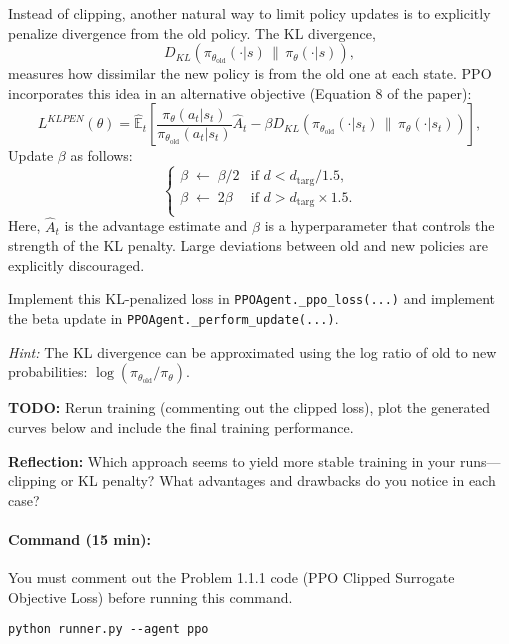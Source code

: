 \documentclass[12pt]{article}
\begin{document}
Instead of clipping, another natural way to limit policy updates is to explicitly penalize divergence from the old policy. The KL divergence,
\[
D_{KL}\!\left(\pi_{\theta_{\text{old}}}(\cdot|s) \,\|\, \pi_\theta(\cdot|s)\right),
\]
measures how dissimilar the new policy is from the old one at each state. PPO incorporates this idea in an alternative objective (Equation 8 of the paper):
\begin{equation}
L^{KLPEN}(\theta) = \hat{\mathbb{E}}_t \left[ \frac{\pi_\theta(a_t|s_t)}{\pi_{\theta_{\text{old}}}(a_t|s_t)} \hat{A}_t - \beta D_{KL}\!\left(\pi_{\theta_{\text{old}}}(\cdot|s_t) \,\|\, \pi_\theta(\cdot|s_t)\right) \right],
\end{equation}
Update $\beta$ as follows:
\[
\begin{cases}
\beta \;\leftarrow\; \beta/2 & \text{if } d < d_{\text{targ}} / 1.5, \\
\beta \;\leftarrow\; 2\beta & \text{if } d > d_{\text{targ}} \times 1.5. \\
\end{cases}
\]
\noindent
Here, $\hat{A}_t$ is the advantage estimate and $\beta$ is a hyperparameter that controls the strength of the KL penalty. Large deviations between old and new policies are explicitly discouraged.

Implement this KL-penalized loss in \texttt{PPOAgent.\_ppo\_loss(...)} and implement the beta update in \texttt{PPOAgent.\_perform\_update(...)}.

\textit{Hint:} The KL divergence can be approximated using the log ratio of old to new probabilities: $\log(\pi_{\theta_{\text{old}}}/\pi_{\theta})$.

\noindent
\textbf{TODO:} Rerun training (commenting out the clipped loss), plot the generated curves below and include the final training performance.

\noindent
\textbf{Reflection:} Which approach seems to yield more stable training in your runs—clipping or KL penalty? What advantages and drawbacks do you notice in each case?

\paragraph{Command (15 min):}
You must comment out the Problem 1.1.1 code (PPO Clipped Surrogate Objective Loss) before running this command.
\begin{verbatim}
python runner.py --agent ppo
\end{verbatim}
\end{document}
